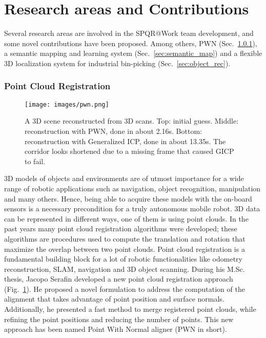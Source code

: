 \documentclass[conference]{IEEEtran}
\begin{document}
 
\section{Research areas and Contributions}\label{sec:research}

Several research areas are involved in the SPQR@Work team development, and some novel contributions have been proposed. Among others, PWN (Sec.~\ref{sec:pwn}), a semantic mapping and learning system (Sec.~\ref{sec:semantic_map}) and a flexible 3D localization system for industrial bin-picking (Sec.~\ref{sec:object_rec}).

\subsubsection{Point Cloud Registration}\label{sec:pwn}

\begin{figure}[t!]
\begin{center}
\texttt{[image: images/pwn.png]}
\end{center}
\caption{A 3D scene reconstructed from 3D scans. Top: initial guess. Middle: reconstruction with PWN, done in about 2.16s. Bottom: reconstruction with Generalized ICP, done in about 13.35s. The corridor looks shortened due to a missing frame that caused GICP to fail.}\label{fig:pwn}
\end{figure}

3D models of objects and environments are of utmost importance for a wide range of robotic applications such as navigation, object recognition, manipulation and many others. Hence, being able to acquire these models with the on-board sensors is a necessary precondition for a truly autonomous mobile robot. 3D data can be represented in different ways, one of them is using point clouds. In the past years many point cloud registration algorithms were developed; these algorithms are procedures used to compute the translation and rotation that maximize the overlap between two point clouds. Point cloud registration is a fundamental building block for a lot of robotic functionalities like odometry reconstruction, SLAM, navigation and 3D object scanning. During his M.Sc. thesis, Jacopo Serafin developed a new point cloud registration approach (Fig.~\ref{fig:pwn}). He proposed a novel formulation to address the computation of the alignment that takes advantage of point position and surface normals. Additionally, he presented a fast method to merge registered point clouds, while refining the point positions and reducing the number of points. This new approach has been named Point With Normal aligner (PWN in short).   
\end{document}
